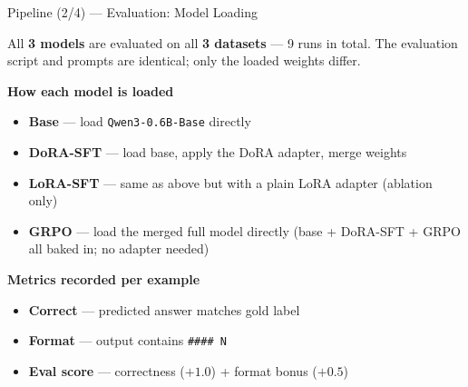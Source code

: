 \documentclass[aspectratio=169,10pt]{beamer}
\begin{document}
\begin{frame}{Pipeline (2/4) — Evaluation: Model Loading}

  All \textbf{3 models} are evaluated on all \textbf{3 datasets} — 9 runs in total.
  The evaluation script and prompts are identical; only the loaded weights differ.

  \vspace{0.8em}
  \textbf{How each model is loaded}
  \begin{itemize}
    \item \textbf{Base} — load \texttt{Qwen3-0.6B-Base} directly
    \item \textbf{DoRA-SFT} — load base, apply the DoRA adapter, merge weights
    \item \textbf{LoRA-SFT} — same as above but with a plain LoRA adapter (ablation only)
    \item \textbf{GRPO} — load the merged full model directly
          (base + DoRA-SFT + GRPO all baked in; no adapter needed)
  \end{itemize}

  \vspace{0.8em}
  \textbf{Metrics recorded per example}
  \begin{itemize}
    \item \textbf{Correct} — predicted answer matches gold label
    \item \textbf{Format} — output contains \texttt{\#\#\#\# N}
    \item \textbf{Eval score} — correctness ($+1.0$) + format bonus ($+0.5$)
  \end{itemize}
\end{frame}
\end{document}
